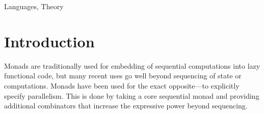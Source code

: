 \documentclass[preprint]{sigplanconf}
\begin{document}




\terms
Languages, Theory



\newcommand{\ident}[1]{{\normalfont\sffamily #1}}
\newcommand{\code}[1]{{\normalfont\ttfamily #1}}
\newcommand{\mzip}[0]{\otimes}
\newcommand{\morelse}[0]{\oplus}
\newcommand{\mzero}[0]{\text{mzero}}
\newcommand{\map}[0]{\text{map}}
\newcommand{\mduplicate}[0]{\text{mdup}}
\newcommand{\mplus}[0]{\oplus}
\newcommand{\fsharp}[0]{F$^\#$}
\newcommand{\todo}[1]{\textcolor{red}{[TODO] #1}}


\section{Introduction}
Monads are traditionally used for embedding of sequential computations into lazy functional code, 
but many recent uses go well beyond sequencing of state or computations. Monads have been used for 
the exact opposite---to explicitly specify parallelism. This is done by taking a core sequential 
monad and providing additional combinators that increase the expressive power beyond sequencing.
\end{document}
